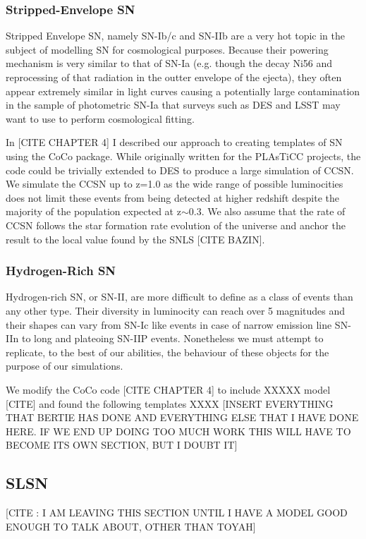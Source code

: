 \subsubsection{Stripped-Envelope SN}
Stripped Envelope SN, namely SN-Ib/c and SN-IIb are a very hot topic in the subject of modelling SN for cosmological purposes. Because their powering mechanism is very similar to that of SN-Ia (e.g. though the decay Ni56 and reprocessing of that radiation in the outter envelope of the ejecta), they often appear extremely similar in light curves causing a potentially large contamination in the sample of photometric SN-Ia that surveys such as DES and LSST may want to use to perform cosmological fitting.

In [CITE CHAPTER 4] I described our approach to creating templates of SN using the CoCo package. While originally written for the PLAsTiCC projects, the code could be trivially extended to DES to produce a large simulation of CCSN. We simulate the CCSN up to z=1.0 as the wide range of possible luminocities does not limit these events from being detected at higher redshift despite the majority of the population expected at z$\sim$0.3. We also assume that the rate of CCSN follows the star formation rate evolution of the universe and anchor the result to the local value found by the SNLS [CITE BAZIN]. \\

\subsubsection{Hydrogen-Rich SN}
Hydrogen-rich SN, or SN-II, are more difficult to define as a class of events than any other type. Their diversity in luminocity can reach over 5 magnitudes and their shapes can vary from SN-Ic like events in case of narrow emission line SN-IIn to long and plateoing SN-IIP events. Nonetheless we must attempt to replicate, to the best of our abilities, the behaviour of these objects for the purpose of our simulations.

We modify the CoCo code [CITE CHAPTER 4] to include XXXXX model [CITE] and found the following templates XXXX [INSERT EVERYTHING THAT BERTIE HAS DONE AND EVERYTHING ELSE THAT I HAVE DONE HERE. IF WE END UP DOING TOO MUCH WORK THIS WILL HAVE TO BECOME ITS OWN SECTION, BUT I DOUBT IT]

\subsection{SLSN}
[CITE : I AM LEAVING THIS SECTION UNTIL I HAVE A MODEL GOOD ENOUGH TO TALK ABOUT, OTHER THAN TOYAH]


